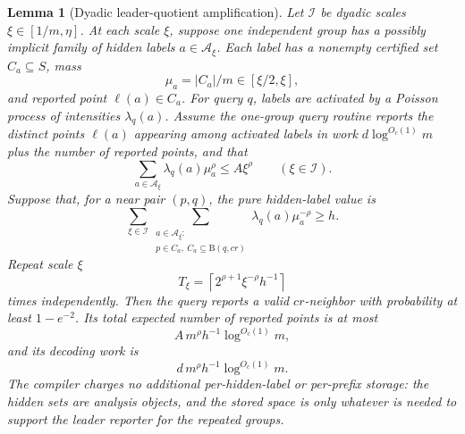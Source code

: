 \documentclass[10pt]{article}
\newtheorem{lemma}[theorem]{Lemma}
\theoremstyle{definition}
\newcommand{\Ball}{\mathrm{B}}
\begin{document}
\begin{lemma}[Dyadic leader-quotient amplification]
   \label{lem:dyadic-leader-quotient}
   Let \(\mathcal I\) be dyadic scales \(\xi\in[1/m,\eta]\).  At each scale
   \(\xi\), suppose one independent group has a possibly implicit family of
   hidden labels \(a\in\mathcal A_\xi\).  Each label has a nonempty certified
   set \(C_a\subseteq S\), mass
   \[
      \mu_a=|C_a|/m\in[\xi/2,\xi],
   \]
   and reported point \(\ell(a)\in C_a\).  For query \(q\), labels are
   activated by a Poisson process of intensities \(\lambda_q(a)\).  Assume the
   one-group query routine reports the distinct points \(\ell(a)\) appearing
   among activated labels in work \(d\log^{O_c(1)}m\) plus the number of
   reported points, and that
   \[
      \sum_{a\in\mathcal A_\xi}\lambda_q(a)\mu_a^\rho
      \le A\xi^\rho
      \qquad(\xi\in\mathcal I).
      \tag{LQA1}
   \]
   Suppose that, for a near pair \((p,q)\), the pure hidden-label value is
   \[
      \sum_{\xi\in\mathcal I}
      \sum_{\substack{a\in\mathcal A_\xi:\\
                      p\in C_a,\ C_a\subseteq\Ball(q,cr)}}
      \lambda_q(a)\mu_a^{-\rho}
      \ge h .
      \tag{LQA2}
   \]
   Repeat scale \(\xi\)
   \[
      T_\xi=\left\lceil2^{\rho+1}\xi^{-\rho}h^{-1}\right\rceil
   \]
   times independently.  Then the query reports a valid \(cr\)-neighbor with
   probability at least \(1-e^{-2}\).  Its total expected number of reported
   points is at most
   \[
      A\,m^\rho h^{-1}\log^{O_c(1)}m,
   \]
   and its decoding work is
   \[
      d\,m^\rho h^{-1}\log^{O_c(1)}m .
   \]
   The compiler charges no additional per-hidden-label or per-prefix storage:
   the hidden sets are analysis objects, and the stored space is only whatever
   is needed to support the leader reporter for the repeated groups.
\end{lemma}
\end{document}
